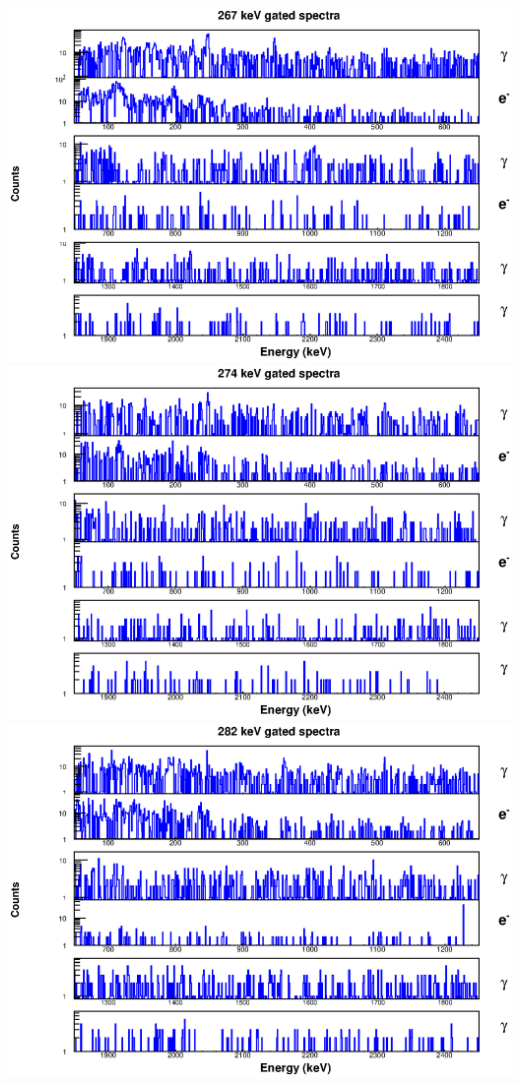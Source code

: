 \begin{landscape}
\includegraphics[scale=1.1]{154Gd_Appendix/267_combined.eps}
\includegraphics[scale=1.1]{154Gd_Appendix/274_combined.eps}
\includegraphics[scale=1.1]{154Gd_Appendix/282_combined.eps}

\end{landscape}
